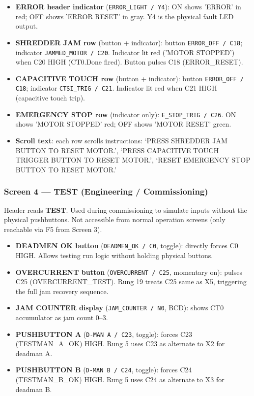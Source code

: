 \documentclass[hidelinks,12pt]{article}
\begin{document}
\begin{itemize}
    \item \textbf{ERROR header indicator} (\texttt{ERROR\_LIGHT / Y4}): ON shows 'ERROR' in red; OFF shows 'ERROR RESET' in gray. Y4 is the physical fault LED output.
    \item \textbf{SHREDDER JAM row} (button + indicator): button \texttt{ERROR\_OFF / C18}; indicator \texttt{JAMMED\_MOTOR / C20}. Indicator lit red ('MOTOR STOPPED') when C20 HIGH (CT0.Done fired). Button pulses C18 (ERROR\_RESET).
    \item \textbf{CAPACITIVE TOUCH row} (button + indicator): button \texttt{ERROR\_OFF / C18}; indicator \texttt{CTSI\_TRIG / C21}. Indicator lit red when C21 HIGH (capacitive touch trip).
    \item \textbf{EMERGENCY STOP row} (indicator only): \texttt{E\_STOP\_TRIG / C26}. ON shows 'MOTOR STOPPED' red; OFF shows 'MOTOR RESET' green.
    \item \textbf{Scroll text}: each row scrolls instructions: `PRESS SHREDDER JAM BUTTON TO RESET MOTOR.', `PRESS CAPACITIVE TOUCH TRIGGER BUTTON TO RESET MOTOR.', `RESET EMERGENCY STOP BUTTON TO RESET MOTOR.'
\end{itemize}

\subsubsection{Screen 4 --- TEST (Engineering / Commissioning)}

Header reads \textbf{TEST}. Used during commissioning to simulate inputs
without the physical pushbuttons. Not accessible from normal operation screens
(only reachable via F5 from Screen 3).

\begin{itemize}
    \item \textbf{DEADMEN OK button} (\texttt{DEADMEN\_OK / C0}, toggle): directly forces C0 HIGH. Allows testing run logic without holding physical buttons.
    \item \textbf{OVERCURRENT button} (\texttt{OVERCURRENT / C25}, momentary on): pulses C25 (OVERCURRENT\_TEST). Rung 19 treats C25 same as X5, triggering the full jam recovery sequence.
    \item \textbf{JAM COUNTER display} (\texttt{JAM\_COUNTER / N0}, BCD): shows CT0 accumulator as jam count 0--3.
    \item \textbf{PUSHBUTTON A} (\texttt{D-MAN A / C23}, toggle): forces C23 (TESTMAN\_A\_OK) HIGH. Rung 5 uses C23 as alternate to X2 for deadman A.
    \item \textbf{PUSHBUTTON B} (\texttt{D-MAN B / C24}, toggle): forces C24 (TESTMAN\_B\_OK) HIGH. Rung 5 uses C24 as alternate to X3 for deadman B.
\end{itemize}
\end{document}
